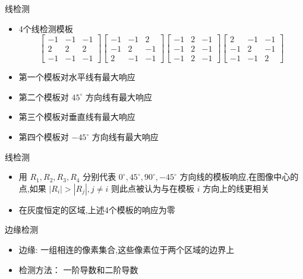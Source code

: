 \documentclass[presentation]{beamer}
\begin{document}
\begin{frame}[label={sec:org4a7728b}]{线检测}
\begin{itemize}
\item 4个线检测模板
\[\begin{bmatrix}
         -1 & -1 & -1 \\
          2 &  2 &  2 \\
         -1 & -1 & -1 \end{bmatrix}\begin{bmatrix}
         -1 & -1 &  2 \\
         -1 &  2 & -1 \\
          2 & -1 & -1 \end{bmatrix}\begin{bmatrix}
         -1 &  2 & -1 \\
         -1 &  2 & -1 \\
         -1 &  2 & -1 \end{bmatrix}\begin{bmatrix}
          2 & -1 & -1 \\
         -1 &  2 & -1 \\
         -1 & -1 &  2 \end{bmatrix}\]
\item 第一个模板对水平线有最大响应
\item 第二个模板对 \(45^{\circ}\) 方向线有最大响应
\item 第三个模板对垂直线有最大响应
\item 第四个模板对 \(-45^{\circ}\) 方向线有最大响应
\end{itemize}
\end{frame}

\begin{frame}[label={sec:orgf4ef85e}]{线检测}
\begin{itemize}
\item 用 \(R_1,R_2,R_3,R_4\) 分别代表 \(0^{\circ},45^{\circ},90^{\circ},-45^{\circ}\) 方向线的模板响应,在图像中心的点,如果 \(|R_i|>|R_j|,j\neq i\)
则此点被认为与在模板 \(i\) 方向上的线更相关
\item 在灰度恒定的区域,上述4个模板的响应为零
\end{itemize}
\end{frame}

\begin{frame}[label={sec:org398d554}]{边缘检测}
\begin{itemize}
\item 边缘: 一组相连的像素集合,这些像素位于两个区域的边界上
\item 检测方法： 一阶导数和二阶导数
\end{itemize}
\end{frame}
\end{document}
